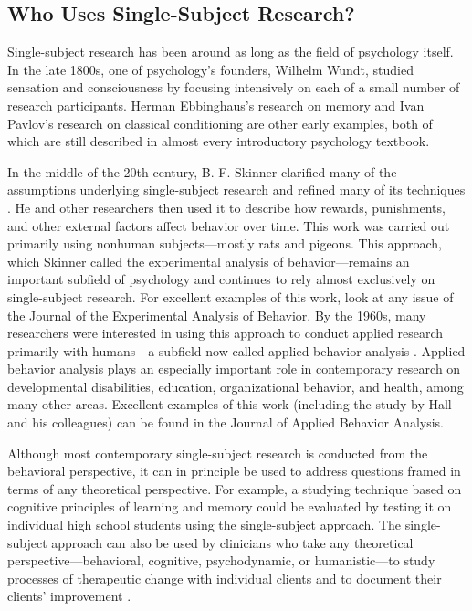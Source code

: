 \subsection{Who Uses Single-Subject Research?}

Single-subject research has been around as long as the field of psychology itself. In the late 1800s, one of psychology's founders, Wilhelm Wundt, studied sensation and consciousness by focusing intensively on each of a small number of research participants. Herman Ebbinghaus's research on memory and Ivan Pavlov's research on classical conditioning are other early examples, both of which are still described in almost every introductory psychology textbook.

In the middle of the 20th century, B. F. Skinner clarified many of the assumptions underlying single-subject research and refined many of its techniques \citep{skinner_behavior_1938}. He and other researchers then used it to describe how rewards, punishments, and other external factors affect behavior over time. This work was carried out primarily using nonhuman subjects---mostly rats and pigeons. This approach, which Skinner called the experimental analysis of behavior---remains an important subfield of psychology and continues to rely almost exclusively on single-subject research. For excellent examples of this work, look at any issue of the Journal of the Experimental Analysis of Behavior. By the 1960s, many researchers were interested in using this approach to conduct applied research primarily with humans---a subfield now called applied behavior analysis \citep{baer_current_1968}. Applied behavior analysis plays an especially important role in contemporary research on developmental disabilities, education, organizational behavior, and health, among many other areas. Excellent examples of this work (including the study by Hall and his colleagues) can be found in the Journal of Applied Behavior Analysis.

Although most contemporary single-subject research is conducted from the behavioral perspective, it can in principle be used to address questions framed in terms of any theoretical perspective. For example, a studying technique based on cognitive principles of learning and memory could be evaluated by testing it on individual high school students using the single-subject approach. The single-subject approach can also be used by clinicians who take any theoretical perspective---behavioral, cognitive, psychodynamic, or humanistic---to study processes of therapeutic change with individual clients and to document their clients' improvement \citep{kazdin_single-case_2011}.


